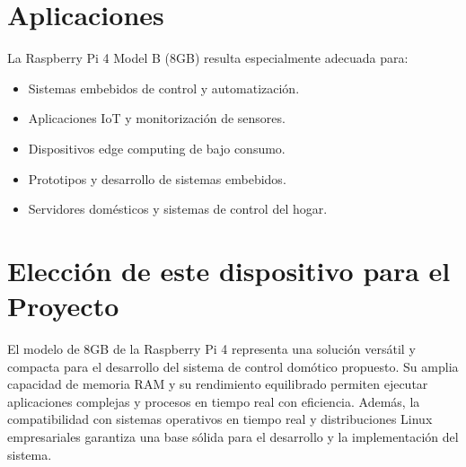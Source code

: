 \section{Aplicaciones}
    La Raspberry Pi 4 Model B (8GB) resulta especialmente adecuada para:
    \begin{itemize}
        \item Sistemas embebidos de control y automatización.
        \item Aplicaciones IoT y monitorización de sensores.
        \item Dispositivos edge computing de bajo consumo.
        \item Prototipos y desarrollo de sistemas embebidos.
        \item Servidores domésticos y sistemas de control del hogar.
    \end{itemize}

\section{Elección de este dispositivo para el Proyecto}
    El modelo de 8GB de la Raspberry Pi 4 representa una solución versátil y compacta para el desarrollo del sistema de control domótico propuesto. Su amplia capacidad de memoria RAM y su rendimiento equilibrado permiten ejecutar aplicaciones complejas y procesos en tiempo real con eficiencia. Además, la compatibilidad con sistemas operativos en tiempo real y distribuciones Linux empresariales garantiza una base sólida para el desarrollo y la implementación del sistema.